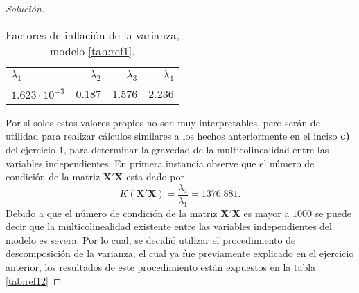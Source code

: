 \documentclass[10.5pt,notitlepage]{article}
\newenvironment{solucion}
  {\begin{proof}[Solución]}
  {\end{proof}}
\theoremstyle{plain}
\begin{document}
\begin{solucion}
\begin{table}[H]
        \centering
        \begin{tabular}{@{}l@{\hskip 0.3in}r@{\hskip 0.3in}r@{\hskip 0.3in}r@{}}
            \toprule
            \(\lambda_1\)& \(\lambda_2\) & \(\lambda_3\)& \(\lambda_4\) \\
            \midrule
           \(1.623\cdot10^{-3}\) &0.187& 1.576& 2.236 \\  
            \bottomrule
        \end{tabular}
        \caption{Factores de inflación de la varianza, modelo \ref{tab:ref1}.}
        \label{tab:ref11}
\end{table}
Por si solos estos valores propios no son muy interpretables, pero serán de utilidad para realizar cálculos similares a los hechos anteriormente en el inciso \textbf{c)} del ejercicio 1, para determinar la gravedad de la multicolinealidad entre las variables independientes. En primera instancia observe que el número de condición de la matriz \(\mathbf{X}'\mathbf{X}\) esta dado por
\begin{equation}\label{numCond 3}
    K(\mathbf{X}'\mathbf{X}) = \frac{\lambda_4}{\lambda_1}= 1376.881. 
\end{equation}
Debido a que el número de condición de la matriz \(\mathbf{X}'\mathbf{X}\) es mayor a \(1000\) se puede decir que la multicolinealidad existente entre las variables independientes del modelo es severa. Por lo cual, se decidió utilizar el procedimiento de descomposición de la varianza, el cual ya fue previamente explicado en el ejercicio anterior, los resultados de este procedimiento están expuestos en la tabla \ref{tab:ref12}
\begin{table}[H]
        \centering
{}
\end{table}
\end{solucion}
\end{document}
